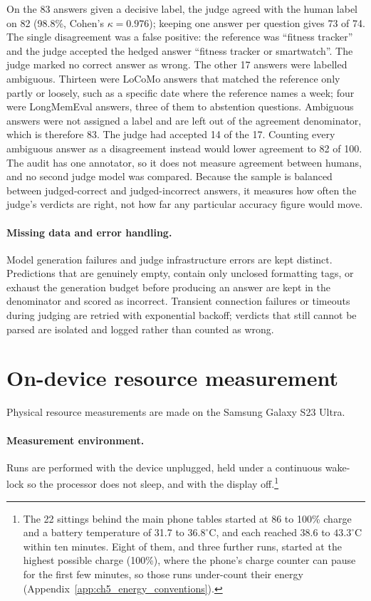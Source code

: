 On the 83 answers given a decisive label, the judge agreed with the human label on 82 (98.8\%, Cohen's
$\kappa=0.976$); keeping one answer per question gives 73 of 74. The single disagreement was a
false positive: the reference was ``fitness tracker'' and the judge accepted the hedged answer
``fitness tracker or smartwatch''. The judge marked no correct answer as wrong. The other 17 answers
were labelled ambiguous. Thirteen were LoCoMo answers that matched the reference only partly or
loosely, such as a specific date where the reference names a week; four were LongMemEval answers,
three of them to abstention questions. Ambiguous answers were not assigned a label and are left out
of the agreement denominator, which is therefore 83. The judge had accepted 14 of the 17. Counting
every ambiguous answer as a disagreement instead would lower agreement to 82 of 100. The audit has one annotator,
so it does not measure agreement between humans, and no second judge model was compared. Because
the sample is balanced between judged-correct and judged-incorrect answers, it measures how often
the judge's verdicts are right, not how far any particular accuracy figure would move.

\paragraph{Missing data and error handling.} Model generation failures and judge infrastructure
errors are kept distinct. Predictions that are genuinely empty, contain only unclosed formatting
tags, or exhaust the generation budget before producing an answer are kept in the denominator and
scored as incorrect. Transient connection failures or timeouts during judging are retried with
exponential backoff; verdicts that still cannot be parsed are isolated and logged rather than counted
as wrong.

\section{On-device resource measurement}
\label{sec:energy}

Physical resource measurements are made on the Samsung Galaxy S23 Ultra.

\paragraph{Measurement environment.} Runs are performed with the device unplugged, held under a
continuous wake-lock so the processor does not sleep, and with the display off.\footnote{The 22
sittings behind the main phone tables started at 86 to 100\% charge and a battery temperature of
31.7 to $36.8^\circ\text{C}$, and each reached 38.6 to $43.3^\circ\text{C}$ within ten minutes.
Eight of them, and three further runs, started at the highest possible charge (100\%), where the
phone's charge counter can pause for the first few minutes, so those runs under-count their energy
(Appendix~\ref{app:ch5_energy_conventions}).}


